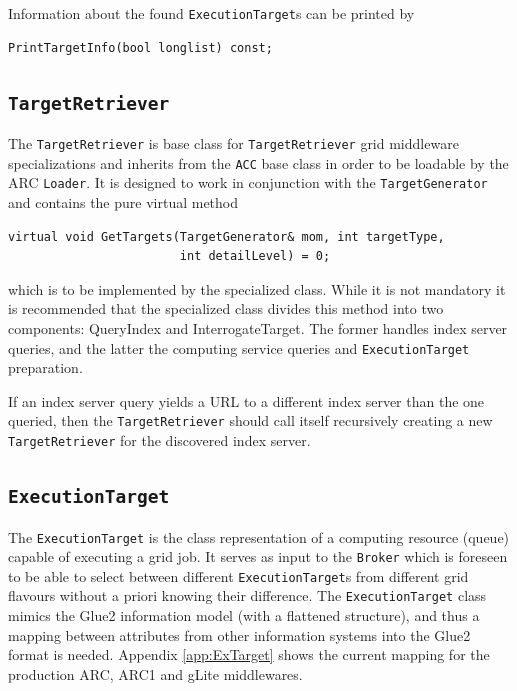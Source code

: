 \documentclass{book}
\newcommand{\ACC}{\texttt{ACC}}
\newcommand{\Broker}{\texttt{Broker}}
\newcommand{\ExecutionTarget}{\texttt{ExecutionTarget}}
\newcommand{\TargetGenerator}{\texttt{TargetGenerator}}
\newcommand{\TargetRetriever}{\texttt{TargetRetriever}}
\begin{document}
Information about the found {\ExecutionTarget}s can be printed by 

\begin{shaded}
\begin{verbatim}
PrintTargetInfo(bool longlist) const;
\end{verbatim}
\end{shaded}

\subsection{{\TargetRetriever}}

The {\TargetRetriever} is base class for {\TargetRetriever} grid
middleware specializations and inherits from the {\ACC} base class in
order to be loadable by the ARC \texttt{Loader}. It is designed to
work in conjunction with the {\TargetGenerator} and contains the pure
virtual method

\begin{shaded}
\begin{verbatim}
virtual void GetTargets(TargetGenerator& mom, int targetType,
                        int detailLevel) = 0;
\end{verbatim}
\end{shaded}

which is to be implemented by the specialized class. While it is not
mandatory it is recommended that the specialized class divides this
method into two components: QueryIndex and InterrogateTarget. The
former handles index server queries, and the latter the computing
service queries and {\ExecutionTarget} preparation.

If an index server query yields a URL to a different index server
than the one queried, then the {\TargetRetriever} should call itself
recursively creating a new {\TargetRetriever} for the discovered index
server.

\subsection{{\ExecutionTarget}}

The {\ExecutionTarget} is the class representation of a computing
resource (queue) capable of executing a grid job. It serves as input
to the {\Broker} which is foreseen to be able to select between
different {\ExecutionTarget}s from different grid flavours without a
priori knowing their difference. The {\ExecutionTarget} class mimics
the Glue2 information model (with a flattened structure), and thus a
mapping between attributes from other information systems into the
Glue2 format is needed. Appendix \ref{app:ExTarget} shows the current
mapping for the production ARC, ARC1 and gLite middlewares.
\end{document}

